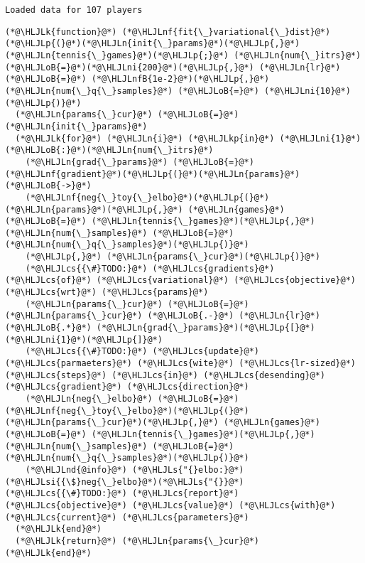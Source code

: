 \documentclass[12pt,a4paper]{article}
\newcommand{\HLJLk}[1]{\textcolor[RGB]{148,91,176}{\textbf{#1}}}
\newcommand{\HLJLkp}[1]{\textcolor[RGB]{148,91,176}{\textbf{#1}}}
\newcommand{\HLJLn}[1]{#1}
\newcommand{\HLJLnd}[1]{\textcolor[RGB]{214,102,97}{#1}}
\newcommand{\HLJLnf}[1]{\textcolor[RGB]{66,102,213}{#1}}
\newcommand{\HLJLs}[1]{\textcolor[RGB]{201,61,57}{#1}}
\newcommand{\HLJLsi}[1]{#1}
\newcommand{\HLJLnfB}[1]{\textcolor[RGB]{59,151,46}{#1}}
\newcommand{\HLJLni}[1]{\textcolor[RGB]{59,151,46}{#1}}
\newcommand{\HLJLoB}[1]{\textcolor[RGB]{102,102,102}{\textbf{#1}}}
\newcommand{\HLJLp}[1]{#1}
\newcommand{\HLJLcs}[1]{\textcolor[RGB]{153,153,119}{\textit{#1}}}
\begin{document}
\begin{lstlisting}
Loaded data for 107 players
\end{lstlisting}


\begin{lstlisting}
(*@\HLJLk{function}@*) (*@\HLJLnf{fit{\_}variational{\_}dist}@*)(*@\HLJLp{(}@*)(*@\HLJLn{init{\_}params}@*)(*@\HLJLp{,}@*) (*@\HLJLn{tennis{\_}games}@*)(*@\HLJLp{;}@*) (*@\HLJLn{num{\_}itrs}@*)(*@\HLJLoB{=}@*)(*@\HLJLni{200}@*)(*@\HLJLp{,}@*) (*@\HLJLn{lr}@*)(*@\HLJLoB{=}@*) (*@\HLJLnfB{1e-2}@*)(*@\HLJLp{,}@*) (*@\HLJLn{num{\_}q{\_}samples}@*) (*@\HLJLoB{=}@*) (*@\HLJLni{10}@*)(*@\HLJLp{)}@*)
  (*@\HLJLn{params{\_}cur}@*) (*@\HLJLoB{=}@*) (*@\HLJLn{init{\_}params}@*)
  (*@\HLJLk{for}@*) (*@\HLJLn{i}@*) (*@\HLJLkp{in}@*) (*@\HLJLni{1}@*)(*@\HLJLoB{:}@*)(*@\HLJLn{num{\_}itrs}@*)
    (*@\HLJLn{grad{\_}params}@*) (*@\HLJLoB{=}@*) (*@\HLJLnf{gradient}@*)(*@\HLJLp{(}@*)(*@\HLJLn{params}@*) (*@\HLJLoB{->}@*)
    (*@\HLJLnf{neg{\_}toy{\_}elbo}@*)(*@\HLJLp{(}@*)(*@\HLJLn{params}@*)(*@\HLJLp{,}@*) (*@\HLJLn{games}@*) (*@\HLJLoB{=}@*) (*@\HLJLn{tennis{\_}games}@*)(*@\HLJLp{,}@*) (*@\HLJLn{num{\_}samples}@*) (*@\HLJLoB{=}@*) (*@\HLJLn{num{\_}q{\_}samples}@*)(*@\HLJLp{)}@*)
    (*@\HLJLp{,}@*) (*@\HLJLn{params{\_}cur}@*)(*@\HLJLp{)}@*)
    (*@\HLJLcs{{\#}TODO:}@*) (*@\HLJLcs{gradients}@*) (*@\HLJLcs{of}@*) (*@\HLJLcs{variational}@*) (*@\HLJLcs{objective}@*) (*@\HLJLcs{wrt}@*) (*@\HLJLcs{params}@*)
    (*@\HLJLn{params{\_}cur}@*) (*@\HLJLoB{=}@*) (*@\HLJLn{params{\_}cur}@*) (*@\HLJLoB{.-}@*) (*@\HLJLn{lr}@*) (*@\HLJLoB{.*}@*) (*@\HLJLn{grad{\_}params}@*)(*@\HLJLp{[}@*)(*@\HLJLni{1}@*)(*@\HLJLp{]}@*)
    (*@\HLJLcs{{\#}TODO:}@*) (*@\HLJLcs{update}@*) (*@\HLJLcs{parmaeters}@*) (*@\HLJLcs{wite}@*) (*@\HLJLcs{lr-sized}@*) (*@\HLJLcs{steps}@*) (*@\HLJLcs{in}@*) (*@\HLJLcs{desending}@*) (*@\HLJLcs{gradient}@*) (*@\HLJLcs{direction}@*)
    (*@\HLJLn{neg{\_}elbo}@*) (*@\HLJLoB{=}@*) (*@\HLJLnf{neg{\_}toy{\_}elbo}@*)(*@\HLJLp{(}@*)(*@\HLJLn{params{\_}cur}@*)(*@\HLJLp{,}@*) (*@\HLJLn{games}@*) (*@\HLJLoB{=}@*) (*@\HLJLn{tennis{\_}games}@*)(*@\HLJLp{,}@*) (*@\HLJLn{num{\_}samples}@*) (*@\HLJLoB{=}@*) (*@\HLJLn{num{\_}q{\_}samples}@*)(*@\HLJLp{)}@*)
    (*@\HLJLnd{@info}@*) (*@\HLJLs{"{}elbo:}@*) (*@\HLJLsi{{\$}neg{\_}elbo}@*)(*@\HLJLs{"{}}@*) (*@\HLJLcs{{\#}TODO:}@*) (*@\HLJLcs{report}@*) (*@\HLJLcs{objective}@*) (*@\HLJLcs{value}@*) (*@\HLJLcs{with}@*) (*@\HLJLcs{current}@*) (*@\HLJLcs{parameters}@*)
  (*@\HLJLk{end}@*)
  (*@\HLJLk{return}@*) (*@\HLJLn{params{\_}cur}@*)
(*@\HLJLk{end}@*)
\end{lstlisting}
\end{document}
